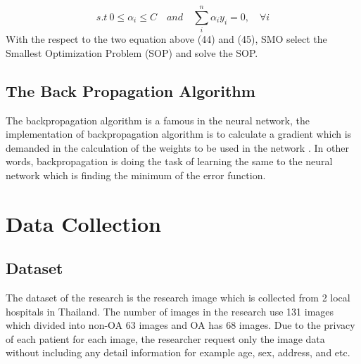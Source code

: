 \documentclass[review]{elsarticle}
\begin{document}
 	\begin{equation}
 	s.t \ 0 \leq \alpha_i \leq C \quad  and \quad \sum_i^n \alpha_i y_i =0, \quad \forall i
 	\end{equation}
 	With the respect to the two equation above (44) and (45), SMO select the Smallest Optimization Problem (SOP) and solve the SOP. 
\subsection{The Back Propagation Algorithm}
 	The backpropagation algorithm is a famous in the neural network, the implementation of backpropagation algorithm is to calculate a gradient which is demanded in the calculation of the weights to be used in the network \cite{Kelley1960}. In other words, backpropagation is doing the task of learning the same to the neural network which is finding the minimum of the error function.



\section{Data Collection } 
\subsection{Dataset}
The dataset of the research is the research image which is collected from 2 local hospitals in Thailand. The number of images in the research use 131 images which divided into non-OA 63 images and OA has 68 images. Due to the privacy of each patient for each image, the researcher request only the image data without including any detail information for example age, sex, address, and etc.
\end{document}

